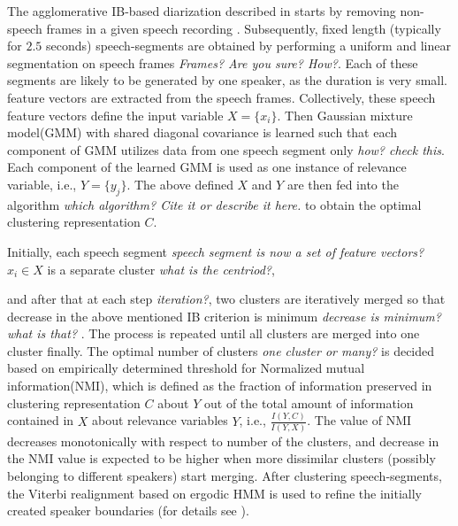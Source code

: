 \documentclass[conference]{IEEEtran}
\begin{document}
The agglomerative IB-based diarization described in \cite{XX} starts by 
removing non-speech frames in a given speech recording \cite{aIB2}. Subsequently, fixed length
(typically for $2.5$ seconds) speech-segments are obtained by performing a
uniform and linear segmentation on speech frames \textit{Frames? Are you sure?
How?}. Each of 
these segments are likely to be generated by one speaker, as the duration
is very small. feature vectors are extracted from the speech frames. Collectively, these 
speech feature vectors define the input
variable $X={\{x_i\}}$. Then Gaussian mixture model(GMM) with shared
diagonal covariance is learned such that each component of GMM utilizes data
from one speech segment only \textit{how? check this}. Each component of the learned
GMM is used as one instance of
relevance variable, i.e., $Y = \{ y_{j}\}$. The above defined $X$ and $Y$ are
then fed into the algorithm \textit{which algorithm? Cite it or describe it
here.} to obtain the optimal clustering representation $C$. 

Initially, each speech segment \textit{speech segment is now a set of feature
vectors?}
$x_i \in X$ is a separate cluster \textit{what is the centriod?}, 

and after that
at each step \textit{iteration?}, two clusters are iteratively merged so that decrease in the above
mentioned IB criterion is minimum \textit{decrease is minimum? what is that?}
\cite{aIB2}. The process is repeated until all
clusters are merged into one cluster finally. The optimal number of clusters
\textit{one cluster or many?}
is decided based on empirically determined threshold for Normalized mutual
information(NMI), which is defined as the fraction of information preserved in
clustering representation $C$ about $Y$ out of the total amount of information
contained in $X$ about relevance variables $Y$, i.e., $\frac{I(Y,C)}{I(Y,X)}$.
The value of NMI decreases monotonically with respect to number of the clusters,
and decrease in the NMI value is expected to be higher when more dissimilar clusters
(possibly belonging to different speakers) start merging.  After clustering
speech-segments, the Viterbi realignment based on ergodic HMM is used to refine
the initially created speaker boundaries (for details see \cite{aIB2}).
\end{document}
